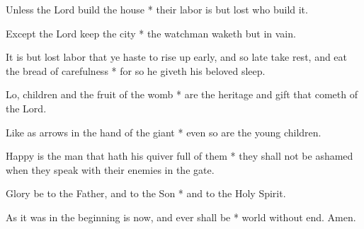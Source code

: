 Unless the Lord build the house * their labor is but lost who build it.

Except the Lord keep the city * the watchman waketh but in vain.

It is but lost labor that ye haste to rise up early, and so late take rest, and eat the bread of carefulness * for so he giveth his beloved sleep.

Lo, children and the fruit of the womb * are the heritage and gift that cometh of the Lord.

Like as arrows in the hand of the giant * even so are the young children.

Happy is the man that hath his quiver full of them * they shall not be ashamed when they speak with their enemies in the gate.

Glory be to the Father, and to the Son * and to the Holy Spirit.

As it was in the beginning is now, and ever shall be * world without end. Amen.